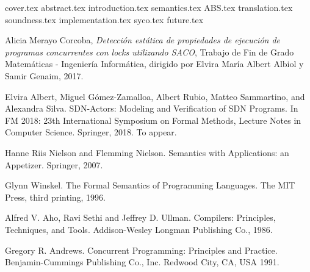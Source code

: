 \documentclass[spanish, a4paper, 12pt] {book}
\begin{document}
{cover.tex}
{abstract.tex}
\tableofcontents
{introduction.tex}
{semantics.tex}
{ABS.tex}
{translation.tex}
{soundness.tex}
{implementation.tex}
{syco.tex}
{future.tex}
\begin{thebibliography}{9}

  Alicia Merayo Corcoba,
  \textit{Detección estática de propiedades de ejecución de programas concurrentes con locks utilizando SACO},
  Trabajo de Fin de Grado Matemáticas - Ingeniería Informática,
  dirigido por Elvira María Albert Albiol y Samir Genaim,
  2017.

 Elvira Albert, Miguel Gómez-Zamalloa, Albert Rubio, Matteo Sammartino, and Alexandra Silva. SDN-Actors: Modeling and Verification of SDN Programs. In FM 2018: 23th International Symposium on Formal Methods, Lecture Notes in Computer Science. Springer, 2018. To appear.

 Hanne Riis Nielson and Flemming Nielson. Semantics with Applications: an Appetizer. Springer, 2007.

 Glynn Winskel. The Formal Semantics of Programming Languages. The MIT Press, third printing, 1996.

  Alfred V. Aho, Ravi Sethi and Jeffrey D. Ullman. Compilers: Principles, Techniques, and Tools. Addison-Wesley Longman Publishing Co., 1986.

 Gregory R. Andrews. Concurrent Programming: Principles and Practice. Benjamin-Cummings Publishing Co., Inc. Redwood City, CA, USA 1991.
\end{thebibliography}
\end{document}
